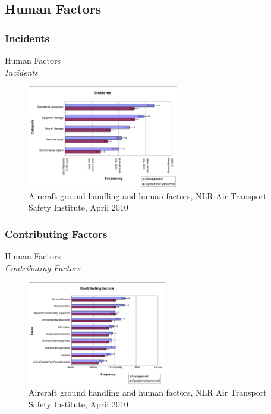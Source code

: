 \subsection{Human Factors}

\subsubsection{Incidents}
\begin{frame}{Human Factors\\\small\textit{Incidents}}{}
	\begin{figure}[H]
	\centering
	\includegraphics[width=250px]{Grafik/FrequencyOfIncidents}
	\caption{\footnotesize Aircraft ground handling and human factors, NLR Air Transport Safety Institute, April 2010}
\end{figure}
\end{frame}

\subsubsection{Contributing Factors}
\begin{frame}{Human Factors\\\small\textit{Contributing Factors}}{}
	\begin{figure}[H]
	\centering
	\includegraphics[width=230px]{Grafik/ContributingFactors}
	\caption{\footnotesize Aircraft ground handling and human factors, NLR Air Transport Safety Institute, April 2010}
\end{figure}
\end{frame}

